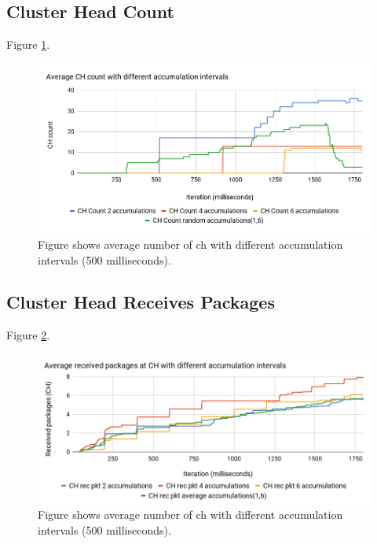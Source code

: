 \documentclass[USenglish]{uit-thesis}
\begin{document}
\subsection{Cluster Head Count}

Figure \ref{fig:chCountChart}.

\begin{figure} [ht]
\centering
\includegraphics[width=\textwidth]{chCountChart.png}
\caption{Figure shows average number of \gls{ch} with different accumulation intervals (500 milliseconds).}
\label{fig:chCountChart}
\end{figure}



\subsection{Cluster Head Receives Packages}


Figure \ref{fig:recPktChart}.

\begin{figure} [ht]
\centering
\includegraphics[width=\textwidth]{recPktChart.png}
\caption{Figure shows average number of \gls{ch} with different accumulation intervals (500 milliseconds).}
\label{fig:recPktChart}
\end{figure}
\end{document}
